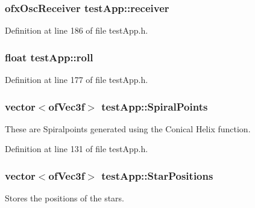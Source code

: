 \hypertarget{classtest_app_a034c44ff60fa1e5f021e90d5410ba657}{
\subsubsection[{receiver}]{\setlength{\rightskip}{0pt plus 5cm}ofx\-Osc\-Receiver test\-App\-::receiver}}\label{classtest_app_a034c44ff60fa1e5f021e90d5410ba657}


Definition at line 186 of file test\-App.\-h.

\hypertarget{classtest_app_a020730abb55e6ae6d0a28edee19050e0}{
\subsubsection[{roll}]{\setlength{\rightskip}{0pt plus 5cm}float test\-App\-::roll}}\label{classtest_app_a020730abb55e6ae6d0a28edee19050e0}


Definition at line 177 of file test\-App.\-h.

\hypertarget{classtest_app_af0dd2f3e3aabdb43bee49d74c156dc05}{
\subsubsection[{Spiral\-Points}]{\setlength{\rightskip}{0pt plus 5cm}vector$<$of\-Vec3f$>$ test\-App\-::\-Spiral\-Points}}\label{classtest_app_af0dd2f3e3aabdb43bee49d74c156dc05}


These are Spiralpoints generated using the Conical Helix function. 



Definition at line 131 of file test\-App.\-h.

\hypertarget{classtest_app_a68d0d30cea64a9d39a1b2deef16677ad}{
\subsubsection[{Star\-Positions}]{\setlength{\rightskip}{0pt plus 5cm}vector$<$of\-Vec3f$>$ test\-App\-::\-Star\-Positions}}\label{classtest_app_a68d0d30cea64a9d39a1b2deef16677ad}


Stores the positions of the stars. 



